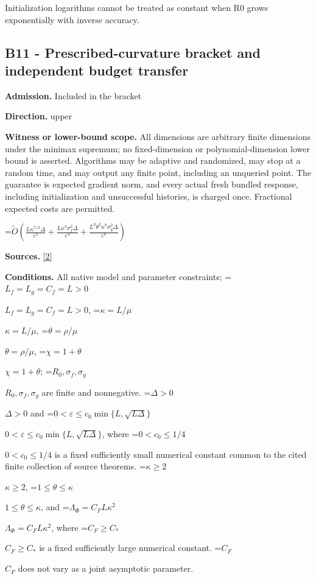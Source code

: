 \documentclass[10pt,a4paper]{article}
\newcommand{\AtlasMath}[1]{\par\begingroup\centering\setbox0=\hbox{$\displaystyle #1$}\ifdim\wd0>1.4\linewidth\typeout{ATLAS WIDE FORMULA: \the\wd0}\fi\ifdim\wd0>\linewidth\resizebox{\linewidth}{!}{\box0}\else\box0\fi\par\endgroup}
\newcommand{\AtlasInlineMath}[1]{\begingroup\setbox0=\hbox{$#1$}\ifdim\wd0>.4\linewidth\endgroup\AtlasMath{#1}\else\endgroup$#1$\fi}
\begin{document}
Initialization logarithms cannot be treated as constant when R0 grows exponentially with inverse accuracy.



\subsection{B11 - Prescribed-curvature bracket and independent budget transfer}


\textbf{Admission.} Included in the bracket



\textbf{Direction.} upper



\textbf{Witness or lower-bound scope.} All dimensions are arbitrary finite dimensions under the minimax supremum; no fixed-dimension or polynomial-dimension lower bound is asserted. Algorithms may be adaptive and randomized, may stop at a random time, and may output any finite point, including an unqueried point. The guarantee is expected gradient norm, and every actual fresh bundled response, including initialization and unsuccessful histories, is charged once. Fractional expected costs are permitted.



\AtlasMath{\widetilde O\!\left(\frac{L\kappa^{5/2}\Delta}{\varepsilon^2}+\frac{L\kappa^4\sigma_f^2\Delta}{\varepsilon^4}+\frac{L^3\theta^2\kappa^8\sigma_g^2\Delta}{\varepsilon^6}\right)}


\textbf{Sources.} \href{https://github.com/WU-Wendao/Colombo/blob/main/colombo_sensorium/Complexity_altas/data/sources/colombo/SFO_JOINT_20261126/manuscript.pdf}{[2]}



\textbf{Conditions.} All native model and parameter constraints; \AtlasInlineMath{L_f=L_g=C_f=L>0}, \AtlasInlineMath{\kappa=L/\mu}, \AtlasInlineMath{\theta=\rho/\mu}, \AtlasInlineMath{\chi=1+\theta}; \AtlasInlineMath{R_0,\sigma_f,\sigma_g} are finite and nonnegative. \AtlasInlineMath{\Delta>0} and \AtlasInlineMath{0<\varepsilon\le c_0\min\{L,\sqrt{L\Delta}\}}, where \AtlasInlineMath{0<c_0\le1/4} is a fixed sufficiently small numerical constant common to the cited finite collection of source theorems. \AtlasInlineMath{\kappa\ge2}, \AtlasInlineMath{1\le\theta\le\kappa}, and \AtlasInlineMath{\Lambda_\Phi=C_F L\kappa^2}, where \AtlasInlineMath{C_F\ge C_*} is a fixed sufficiently large numerical constant. \AtlasInlineMath{C_F} does not vary as a joint asymptotic parameter.
\end{document}
